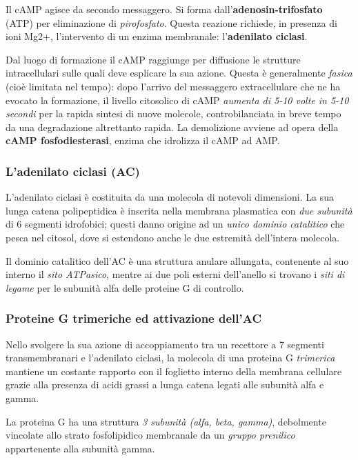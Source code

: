 \documentclass[]{article}
\begin{document}
Il cAMP agisce da secondo messaggero. Si forma
dall'\textbf{adenosin-trifosfato} (ATP) per eliminazione di
\emph{pirofosfato}. Questa reazione richiede, in presenza di ioni Mg2+,
l'intervento di un enzima membranale: l'\textbf{adenilato ciclasi}.

Dal luogo di formazione il cAMP raggiunge per diffusione le strutture
intracellulari sulle quali deve esplicare la sua azione. Questa è
generalmente \emph{fasica} (cioè limitata nel tempo): dopo l'arrivo del
messaggero extracellulare che ne ha evocato la formazione, il livello
citosolico di cAMP \emph{aumenta di 5-10 volte in 5-10 secondi} per la
rapida sintesi di nuove molecole, controbilanciata in breve tempo da una
degradazione altrettanto rapida. La demolizione avviene ad opera della
\textbf{cAMP fosfodiesterasi}, enzima che idrolizza il cAMP ad AMP.

\subsubsection{L'adenilato ciclasi (AC)}\label{ladenilato-ciclasi-ac}

L'adenilato ciclasi è costituita da una molecola di notevoli dimensioni.
La sua lunga catena polipeptidica è inserita nella membrana plasmatica
con \emph{due subunità} di 6 segmenti idrofobici; questi danno origine
ad un \emph{unico dominio catalitico} che pesca nel citosol, dove si
estendono anche le due estremità dell'intera molecola.

Il dominio catalitico dell'AC è una struttura anulare allungata,
contenente al suo interno il \emph{sito ATPasico}, mentre ai due poli
esterni dell'anello si trovano i \emph{siti di legame} per le subunità
alfa delle proteine G di controllo.

\subsubsection{Proteine G trimeriche ed attivazione
dell'AC}\label{proteine-g-trimeriche-ed-attivazione-dellac}

Nello svolgere la sua azione di accoppiamento tra un recettore a 7
segmenti transmembranari e l'adenilato ciclasi, la molecola di una
proteina G \emph{trimerica} mantiene un costante rapporto con il
foglietto interno della membrana cellulare grazie alla presenza di acidi
grassi a lunga catena legati alle subunità alfa e gamma.

La proteina G ha una struttura \emph{3 subunità (alfa, beta, gamma)},
debolmente vincolate allo strato fosfolipidico membranale da un
\emph{gruppo prenilico} appartenente alla subunità gamma.
\end{document}
